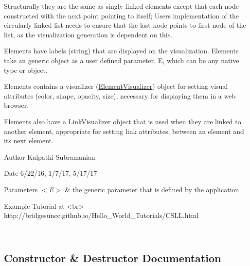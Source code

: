 Structurally they are the same as singly linked elements except that each node constructed with the next point pointing to itself; User\textquotesingle{}s implementation of the circularly linked list needs to ensure that the last node points to first node of the list, as the visualization generation is dependent on this.

Elements have labels (string) that are displayed on the visualization. Elements take an generic object as a user defined parameter, E, which can be any native type or object.

Elements contains a visualizer (\mbox{\hyperlink{namespace_bridges_1_1_element_visualizer}{Element\+Visualizer}}) object for setting visual attributes (color, shape, opacity, size), necessary for displaying them in a web browser.

Elements also have a \mbox{\hyperlink{namespace_bridges_1_1_link_visualizer}{Link\+Visualizer}} object that is used when they are linked to another element, appropriate for setting link attributes, between an element and its next element.

\begin{DoxyAuthor}{Author}
Kalpathi Subramanian
\end{DoxyAuthor}
\begin{DoxyDate}{Date}
6/22/16, 1/7/17, 5/17/17
\end{DoxyDate}

\begin{DoxyParams}{Parameters}
{\em $<$\+E$>$} & the generic parameter that is defined by the application \begin{DoxyVerb}\sa Example Tutorial at <br>
        http://bridgesuncc.github.io/Hello_World_Tutorials/CSLL.html\end{DoxyVerb}
 \\
\hline
\end{DoxyParams}


\subsection{Constructor \& Destructor Documentation}
\mbox{\label{class_bridges_1_1_circ_s_lelement_1_1_circ_s_lelement_ae7e31a351fb3d4009cd5bc58eb0cdff4}} 
